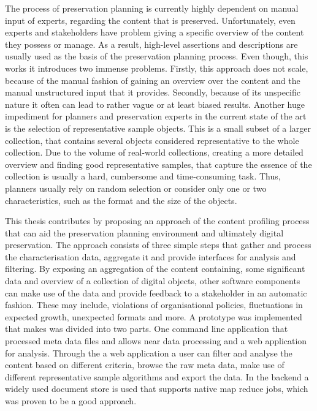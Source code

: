 The process of preservation planning is currently highly dependent on manual input of experts, regarding the content that is preserved.
Unfortunately, even experts and stakeholders have problem giving a specific overview of the content they possess or manage.
As a result, high-level assertions and descriptions are usually used as the basis of the preservation planning process.
Even though, this works it introduces two immense problems.
Firstly, this approach does not scale, because of the manual fashion of gaining an overview over the content and the manual unstructured input that it provides.
Secondly, because of its unspecific nature it often can lead to rather vague or at least biased results.
Another huge impediment for planners and preservation experts in the current state of the art is the selection of representative sample objects.
This is a small subset of a larger collection, that contains several objects considered representative to the whole collection. 
Due to the volume of real-world collections, creating a more detailed overview and finding good representative samples, that capture the essence of the collection is usually a hard, cumbersome and time-consuming task.
Thus, planners usually rely on random selection or consider only one or two characteristics, such as the format and the size of the objects.


This thesis contributes by proposing an approach of the content profiling process that can aid the preservation planning environment and ultimately digital preservation.
The approach consists of three simple steps that gather and process the characterisation data, aggregate it and provide
interfaces for analysis and filtering.
By exposing an aggregation of the content containing, some significant data and overview of a collection of digital objects, other software components can make use of the data and provide feedback to a stakeholder in an automatic fashion. 
These may include, violations of organisational policies, fluctuations in expected growth, unexpected formats and more.
A prototype was implemented that makes was divided into two parts.
One command line application that processed meta data files and allows near data processing and a web application for analysis.
Through the a web application a user can filter and analyse the content based on different criteria, browse the raw meta data, make use of different representative sample algorithms and export the data.
In the backend a widely used document store is used that supports native map reduce jobs, which was proven to be a good approach.

